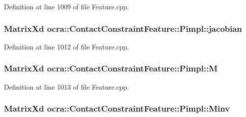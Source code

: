 Definition at line 1009 of file Feature.\+cpp.

\subsubsection[{\texorpdfstring{jacobian}{jacobian}}]{\setlength{\rightskip}{0pt plus 5cm}Matrix\+Xd ocra\+::\+Contact\+Constraint\+Feature\+::\+Pimpl\+::jacobian}\hypertarget{structocra_1_1ContactConstraintFeature_1_1Pimpl_ab7a5dfed0b05f6871bad4fcf61d7e998}{}\label{structocra_1_1ContactConstraintFeature_1_1Pimpl_ab7a5dfed0b05f6871bad4fcf61d7e998}


Definition at line 1012 of file Feature.\+cpp.

\subsubsection[{\texorpdfstring{M}{M}}]{\setlength{\rightskip}{0pt plus 5cm}Matrix\+Xd ocra\+::\+Contact\+Constraint\+Feature\+::\+Pimpl\+::M}\hypertarget{structocra_1_1ContactConstraintFeature_1_1Pimpl_a2de0104acc90d7ef05e0b5d5c6142ed5}{}\label{structocra_1_1ContactConstraintFeature_1_1Pimpl_a2de0104acc90d7ef05e0b5d5c6142ed5}


Definition at line 1013 of file Feature.\+cpp.

\subsubsection[{\texorpdfstring{Minv}{Minv}}]{\setlength{\rightskip}{0pt plus 5cm}Matrix\+Xd ocra\+::\+Contact\+Constraint\+Feature\+::\+Pimpl\+::\+Minv}\hypertarget{structocra_1_1ContactConstraintFeature_1_1Pimpl_afa7af0eb036037f47dfa1b93c02cd3d5}{}\label{structocra_1_1ContactConstraintFeature_1_1Pimpl_afa7af0eb036037f47dfa1b93c02cd3d5}


